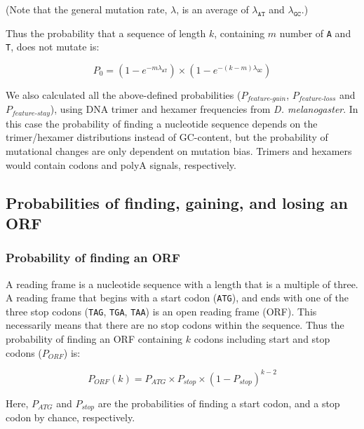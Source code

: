 \documentclass[12pt,a4paper]{article}
\newcommand{\cmnt}[1]{{\color{purple} #1}}
\begin{document}
(Note that the general mutation rate, $\lambda$, is an average of $\lambda_\texttt{AT}$ and $\lambda_\texttt{GC}$.)

\vspace{1\baselineskip}

Thus the probability that a sequence of length $k$, containing $m$ number of \texttt{A} and \texttt{T}, does not mutate is:

\vspace{-1ex}

$$P_0 = (1-e^{-m\lambda_\texttt{AT}})\times(1-e^{-(k-m)\lambda_\texttt{GC}})$$


\cmnt{We also calculated all the above-defined probabilities ($P_\textit{feature-gain}$, $P_\textit{feature-loss}$ and $ P_\textit{feature-stay}$), using DNA trimer and hexamer frequencies from \textit{D. melanogaster}. In this case the probability of finding a nucleotide sequence depends on the trimer/hexamer distributions instead of GC-content, but the probability of mutational changes are only dependent on mutation bias. Trimers and hexamers would contain codons and polyA signals, respectively.}



\subsection{Probabilities of finding, gaining, and losing an ORF}

\label{methORF}

\subsubsection{Probability of finding an ORF}

A reading frame is a nucleotide sequence with a length that is a multiple of three. A reading frame that begins with a start codon (\texttt{ATG}), and ends with one of the three stop codons (\texttt{TAG}, \texttt{TGA}, \texttt{TAA}) is an open reading frame (ORF). This necessarily means that there are no stop codons within the sequence. Thus the probability of finding an ORF containing $k$ codons including start and stop codons ($P_\textit{ORF}$) is: 

\begin{equation}
P_\textit{ORF}(k) = P_\textit{ATG} \times P_\textit{stop} \times (1 - P_\textit{stop})^{k-2}
\label{eqorfprob}
\end{equation}

Here, $P_\textit{ATG}$ and $P_\textit{stop}$ are the probabilities of finding a start codon, and a stop codon by chance, respectively.
\end{document}

